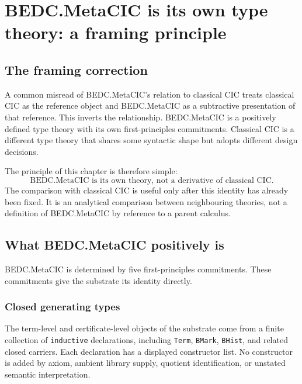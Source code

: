 \chapter{BEDC.MetaCIC is its own type theory: a framing principle}
\label{ch:bedc-is-its-own-theory}

\section{The framing correction}
\label{sec:bedc-is-its-own-theory-framing-correction}

A common misread of BEDC.MetaCIC's relation to classical CIC treats
classical CIC as the reference object and BEDC.MetaCIC as a subtractive
presentation of that reference. This inverts the relationship.
BEDC.MetaCIC is a positively defined type theory with its own
first-principles commitments. Classical CIC is a different type theory
that shares some syntactic shape but adopts different design decisions.

The principle of this chapter is therefore simple:
$$
\text{BEDC.MetaCIC is its own theory, not a derivative of classical CIC.}
$$
The comparison with classical CIC is useful only after this identity has
already been fixed. It is an analytical comparison between neighbouring
theories, not a definition of BEDC.MetaCIC by reference to a parent
calculus.

\section{What BEDC.MetaCIC positively is}
\label{sec:bedc-is-its-own-theory-positive-definition}

BEDC.MetaCIC is determined by five first-principles commitments. These
commitments give the substrate its identity directly.

\subsection{Closed generating types}
\label{subsec:bedc-is-its-own-theory-closed-generators}

The term-level and certificate-level objects of the substrate come from
a finite collection of \texttt{inductive} declarations, including
\texttt{Term}, \texttt{BMark}, \texttt{BHist}, and related closed
carriers. Each declaration has a displayed constructor list. No
constructor is added by axiom, ambient library supply, quotient
identification, or unstated semantic interpretation.

